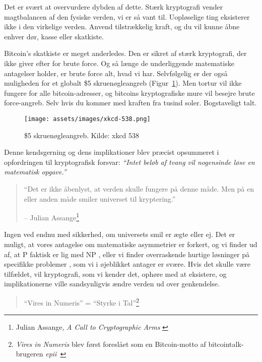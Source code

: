   
  Det er svært at overvurdere dybden af dette. Stærk kryptografi
  vender magtbalancen af den fysiske verden, vi er så vant til.
  Uopløselige ting eksisterer ikke i den virkelige verden. Anvend tilstrækkelig 
  kraft, og du vil kunne åbne enhver dør, kasse eller skatkiste.
  
  Bitcoin's skatkiste er meget anderledes. Den er sikret af stærk
  kryptografi, der ikke giver efter for brute force. Og så længe de
  underliggende matematiske antagelser holder, er brute force alt, hvad vi har.
  Selvfølgelig er der også muligheden for et globalt \$5 skruenøgleangreb 
  (Figur~\ref{fig:xkcd-538}). Men tortur vil ikke fungere for alle 
  bitcoin-adresser, og bitcoins kryptografiske mure vil besejre brute 
  force-angreb. Selv hvis du kommer med kraften fra tusind soler. 
  Bogstaveligt talt.

\begin{figure}[htbp]
  \centering
  \texttt{[image: assets/images/xkcd-538.png]}
  \caption{\$5 skruenøgleangreb. Kilde: xkcd 538}
  \label{fig:xkcd-538}
\end{figure}  

Denne kendsgerning og dens implikationer blev præcist opsummeret i opfordringen
til kryptografisk forsvar: \textit{\enquote{Intet beløb af tvang vil 
nogensinde løse en matematisk opgave.}}

\begin{quotation}\begin{samepage}
\enquote{Det er ikke åbenlyst, at verden skulle fungere på denne måde. Men på 
en eller anden måde smiler universet til kryptering.}
\begin{flushright} -- Julian Assange\footnote{Julian Assange, \textit{A Call 
  to Cryptographic Arms} \cite{call-to-cryptographic-arms}}
\end{flushright}\end{samepage}\end{quotation}

Ingen ved endnu med sikkerhed, om universets smil er ægte eller ej. Det
er muligt, at vores antagelse om matematiske asymmetrier er forkert, og
vi finder ud af, at P faktisk er lig med NP \cite{wiki:pnp}, eller vi finder 
overraskende hurtige løsninger på specifikke problemer \cite{wiki:discrete-log}, 
som vi i øjeblikket antager er svære. Hvis det skulle være tilfældet, vil 
kryptografi, som vi kender det, ophøre med at eksistere, og implikationerne 
ville sandsynligvis ændre verden ud over genkendelse.

\begin{quotation}\begin{samepage}
\enquote{Vires in Numeris} = \enquote{Styrke i Tal}\footnote{\textit{Vires in Numeris} blev først foreslået som en Bitcoin-motto af bitcointalk-brugeren \textit{epii}~\cite{epii}}
\end{samepage}\end{quotation}

